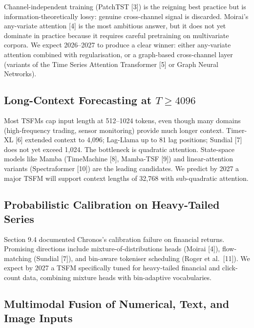 Channel-independent training (PatchTST {[}3{]}) is the reigning best practice but is information-theoretically lossy: genuine cross-channel signal is discarded. Moirai's any-variate attention {[}4{]} is the most ambitious answer, but it does not yet dominate in practice because it requires careful pretraining on multivariate corpora. We expect 2026--2027 to produce a clear winner: either any-variate attention combined with regularisation, or a graph-based cross-channel layer (variants of the Time Series Attention Transformer {[}5{]} or Graph Neural Networks).

\subsection{\texorpdfstring{Long-Context Forecasting at \(T \geq 4096\)}{Long-Context Forecasting at T \textbackslash geq 4096}}\label{long-context-forecasting-at-t-geq-4096}

Most TSFMs cap input length at 512--1024 tokens, even though many domains (high-frequency trading, sensor monitoring) provide much longer context. Timer-XL {[}6{]} extended context to 4,096; Lag-Llama up to 81 lag positions; Sundial {[}7{]} does not yet exceed 1,024. The bottleneck is quadratic attention. State-space models like Mamba (TimeMachine {[}8{]}, Mamba-TSF {[}9{]}) and linear-attention variants (Spectraformer {[}10{]}) are the leading candidates. We predict by 2027 a major TSFM will support context lengths of 32,768 with sub-quadratic attention.

\subsection{Probabilistic Calibration on Heavy-Tailed Series}\label{probabilistic-calibration-on-heavy-tailed-series}

Section 9.4 documented Chronos's calibration failure on financial returns. Promising directions include mixture-of-distributions heads (Moirai {[}4{]}), flow-matching (Sundial {[}7{]}), and bin-aware tokeniser scheduling (Roger et al.~{[}11{]}). We expect by 2027 a TSFM specifically tuned for heavy-tailed financial and click-count data, combining mixture heads with bin-adaptive vocabularies.

\subsection{Multimodal Fusion of Numerical, Text, and Image Inputs}\label{multimodal-fusion-of-numerical-text-and-image-inputs}

